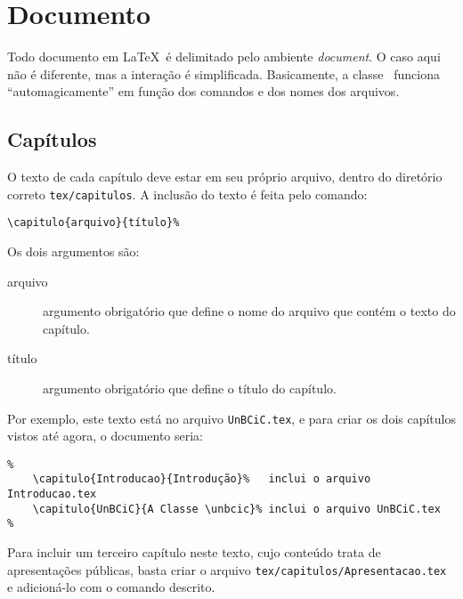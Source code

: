 \section{Documento}
Todo documento em \LaTeX\ é delimitado pelo ambiente \emph{document}. O caso aqui 
não é diferente, mas a interação é simplificada. Basicamente, a classe \unbcic\ 
funciona ``automagicamente'' em função dos comandos e dos nomes dos arquivos. 


\subsection{Capítulos}
O texto de cada capítulo deve estar em seu próprio arquivo, dentro do diretório 
correto \texttt{tex/capitulos}. A inclusão do texto é feita pelo comando: 
\begin{verbatim}
\capitulo{arquivo}{título}%
\end{verbatim}

Os dois argumentos são:
\begin{description}%
\item[arquivo] argumento obrigatório que define o nome do arquivo que contém o 
texto do capítulo.
\item[título] argumento obrigatório que define o título do capítulo.
\end{description}%

Por exemplo, este texto está no arquivo \texttt{UnBCiC.tex}, e para criar os 
dois capítulos vistos até agora, o documento seria:

\begin{verbatim}
%
    \capitulo{Introducao}{Introdução}%   inclui o arquivo Introducao.tex
    \capitulo{UnBCiC}{A Classe \unbcic}% inclui o arquivo UnBCiC.tex
%
\end{verbatim}

Para incluir um terceiro capítulo neste texto, cujo conteúdo trata de apresentações 
públicas, basta criar o arquivo \texttt{tex/capitulos/Apresentacao.tex} e 
adicioná-lo com o comando descrito.

